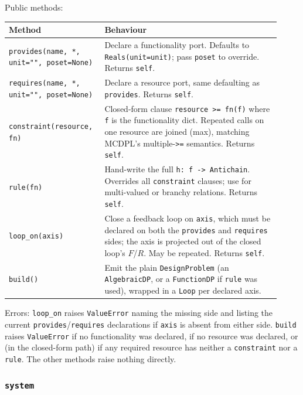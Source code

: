 \documentclass[11pt,a4paper]{article}
\begin{document}
Public methods:
\begin{center}
\begin{tabular}{@{}p{0.30\linewidth}p{0.62\linewidth}@{}}
\toprule
\textbf{Method} & \textbf{Behaviour} \\
\midrule
\texttt{provides(name, *, unit="", poset=None)} &
  Declare a functionality port. Defaults to \texttt{Reals(unit=unit)};
  pass \texttt{poset} to override. Returns \texttt{self}. \\
\texttt{requires(name, *, unit="", poset=None)} &
  Declare a resource port, same defaulting as \texttt{provides}. Returns
  \texttt{self}. \\
\texttt{constraint(resource, fn)} &
  Closed-form clause \texttt{resource >= fn(f)} where \texttt{f} is the
  functionality dict. Repeated calls on one resource are joined (max),
  matching MCDPL's multiple-\texttt{>=} semantics. Returns \texttt{self}. \\
\texttt{rule(fn)} &
  Hand-write the full \texttt{h: f -> Antichain}. Overrides all
  \texttt{constraint} clauses; use for multi-valued or branchy relations.
  Returns \texttt{self}. \\
\texttt{loop\_on(axis)} &
  Close a feedback loop on \texttt{axis}, which must be declared on both
  the \texttt{provides} and \texttt{requires} sides; the axis is projected
  out of the closed loop's $F$/$R$. May be repeated. Returns \texttt{self}. \\
\texttt{build()} &
  Emit the plain \texttt{DesignProblem} (an \texttt{AlgebraicDP}, or a
  \texttt{FunctionDP} if \texttt{rule} was used), wrapped in a
  \texttt{Loop} per declared axis. \\
\bottomrule
\end{tabular}
\end{center}

Errors: \texttt{loop\_on} raises \texttt{ValueError} naming the missing
side and listing the current \texttt{provides}/\texttt{requires}
declarations if \texttt{axis} is absent from either side. \texttt{build}
raises \texttt{ValueError} if no functionality was declared, if no
resource was declared, or (in the closed-form path) if any required
resource has neither a \texttt{constraint} nor a \texttt{rule}. The other
methods raise nothing directly.

\subsubsection{\texttt{system}}
\label{ref:system}
\end{document}
